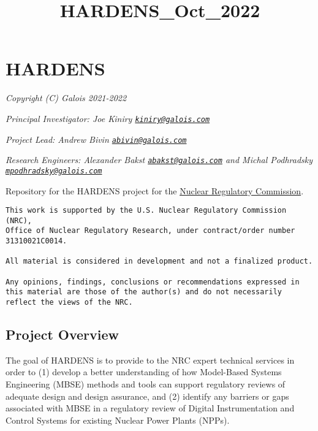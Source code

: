\documentclass[11pt]{article}
\title{HARDENS\_Oct\_2022}
\begin{document}
    
    \maketitle
    
    

    
    \hypertarget{hardens}{%
\section{HARDENS}\label{hardens}}

\emph{Copyright (C) Galois 2021-2022}

\emph{Principal Investigator: Joe Kiniry
\href{mailto:kiniry@galois.com}{\nolinkurl{kiniry@galois.com}}}

\emph{Project Lead: Andrew Bivin
\href{mailto:abivin@galois.com}{\nolinkurl{abivin@galois.com}}}

\emph{Research Engineers: Alexander Bakst
\href{mailto:abakst@galois.com}{\nolinkurl{abakst@galois.com}} and
Michal Podhradsky
\href{mailto:mpodhradsky@galois.com}{\nolinkurl{mpodhradsky@galois.com}}}

Repository for the HARDENS project for the
\href{https://www.nrc.gov/about-nrc.html}{Nuclear Regulatory
Commission}.

\begin{verbatim}
This work is supported by the U.S. Nuclear Regulatory Commission (NRC), 
Office of Nuclear Regulatory Research, under contract/order number 31310021C0014.

All material is considered in development and not a finalized product. 

Any opinions, findings, conclusions or recommendations expressed in
this material are those of the author(s) and do not necessarily
reflect the views of the NRC.
\end{verbatim}

\hypertarget{project-overview}{%
\subsection{Project Overview}\label{project-overview}}

The goal of HARDENS is to provide to the NRC expert technical services
in order to (1) develop a better understanding of how Model-Based
Systems Engineering (MBSE) methods and tools can support regulatory
reviews of adequate design and design assurance, and (2) identify any
barriers or gaps associated with MBSE in a regulatory review of Digital
Instrumentation and Control Systems for existing Nuclear Power Plants
(NPPs).
\end{document}
